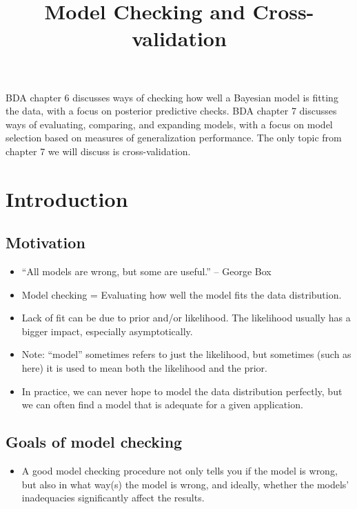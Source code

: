 \documentclass[12pt]{article}
\title{Model Checking and Cross-validation}
\author{}
\date{}
\begin{document}
\maketitle

\tableofcontents


\vspace{2em}

BDA chapter 6 discusses ways of checking how well a Bayesian model is fitting the data, with a focus on posterior predictive checks. BDA chapter 7 discusses ways of evaluating, comparing, and expanding models, with a focus on model selection based on measures of generalization performance. The only topic from chapter 7 we will discuss is cross-validation.

\newpage

\section{Introduction}

\subsection*{Motivation}
\begin{itemize}
\item ``All models are wrong, but some are useful.'' -- George Box
\item Model checking = Evaluating how well the model fits the data distribution.
\item Lack of fit can be due to prior and/or likelihood. The likelihood usually has a bigger impact, especially asymptotically.
\item Note: ``model'' sometimes refers to just the likelihood, but sometimes (such as here) it is used to mean both the likelihood and the prior.
\item In practice, we can never hope to model the data distribution perfectly, but we can often find a model that is adequate for a given application.
\end{itemize}

\subsection*{Goals of model checking}
\begin{itemize}
\item A good model checking procedure not only tells you if the model is wrong, but also in what way(s) the model is wrong, and ideally, whether the models' inadequacies significantly affect the results.
\end{itemize}
\end{document}
